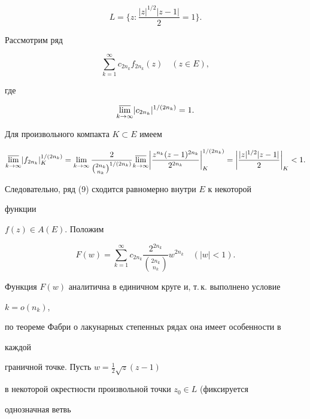 $$ 


L=\bigg\{z:\frac{|z|^{1/2}|z-1|}{2}=1\bigg\}. 


$$ 


Рассмотрим ряд 


\begin{equation} 


\sum^\infty_{k=1}c_{2n_k}f_{2n_k}(z)\quad (z\in E), 


\end{equation} 


где 


\begin{equation} 


\underset{k\to\infty}{\varlimsup}{}|c_{2n_k}|^{1/(2n_k)}=1. 


\end{equation} 


Для произвольного компакта $K\subset E$ имеем 


$$ 


\underset{k\to\infty}{\varlimsup}{}|f_{2n_k}|^{1/(2n_k)}_K= 


\lim_{k\to\infty}\frac{2}{\binom{2n_k}{n_k}^{1/(2n_k)}} 


\underset{k\to\infty}{\varlimsup}{}\bigg| 


\frac{z^{n_k}(z-1)^{2n_k}}{2^{2n_k}}\bigg|^{1/(2n_k)}_K= 


\bigg|\frac{|z|^{1/2}|z-1|}{2}\bigg|_K<1. 


$$ 


Следовательно, ряд (9) сходится равномерно внутри $E$ к некоторой 


функции 


$f(z)\in A(E)$. Положим 


$$ 


F(w)=\sum^\infty_{k=1}c_{2n_k} 


\frac{2^{2n_k}}{\binom{2n_k}{n_k}}w^{2n_k}\quad (|w|<1). 


$$ 


Функция $F(w)$ аналитична в единичном круге и, т.\,к. выполнено условие 


$k=o(n_k)$, 


по теореме Фабри о лакунарных степенных рядах она имеет особенности в 


каждой 


граничной точке. Пусть $w=\frac{1}{2}\sqrt{z}(z-1)$ 


в некоторой окрестности произвольной точки $z_0\in L$ (фиксируется 


однозначная ветвь 


